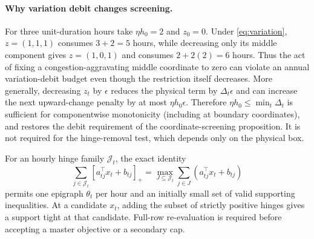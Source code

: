 \documentclass[11pt]{article}
\begin{document}
\paragraph{Why variation debit changes screening.}
For three unit-duration hours take $\eta h_0=2$ and $z_0=0$. Under \eqref{eq:variation}, $z=(1,1,1)$ consumes $3+2=5$ hours, while decreasing only its middle component gives $z=(1,0,1)$ and consumes $2+2(2)=6$ hours. Thus the act of fixing a congestion-aggravating middle coordinate to zero can violate an annual variation-debit budget even though the restriction itself decreases. More generally, decreasing $z_t$ by $\epsilon$ reduces the physical term by $\Delta_t\epsilon$ and can increase the next upward-change penalty by at most $\eta h_0\epsilon$. Therefore $\eta h_0\leq\min_t\Delta_t$ is sufficient for componentwise monotonicity (including at boundary coordinates), and restores the debit requirement of the coordinate-screening proposition. It is not required for the hinge-removal test, which depends only on the physical box.

For an hourly hinge family $\mathcal J_t$, the exact identity
\begin{equation}
 \sum_{j\in\mathcal J_t}[a_{tj}^\top x_t+b_{tj}]_+
 =\max_{J\subseteq\mathcal J_t}\sum_{j\in J}(a_{tj}^\top x_t+b_{tj})
\end{equation}
permits one epigraph $\theta_t$ per hour and an initially small set of valid supporting inequalities. At a candidate $x_t$, adding the subset of strictly positive hinges gives a support tight at that candidate. Full-row re-evaluation is required before accepting a master objective or a secondary cap.
\end{document}
